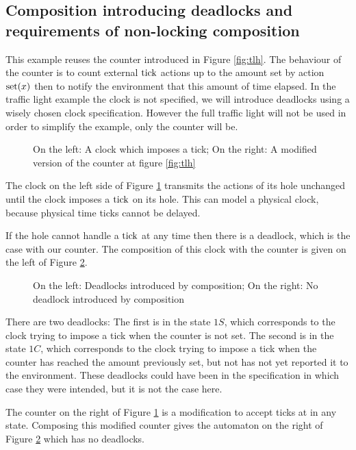 \documentclass{article}
\begin{document}
\subsection{Composition introducing deadlocks and requirements of non-locking composition}\label{apx:lockcomp}
\begin{exi}
This example reuses the counter introduced in Figure \ref{fig:tlh}.
The behaviour of the counter is to count external \(\mathrm{tick}\) actions up to the amount set by action \(\mathrm{set}{\left(x\right)}\) then to notify the environment that this amount of time elapsed.
In the traffic light example the clock is not specified, we will introduce deadlocks using a wisely chosen clock specification.
However the full traffic light will not be used in order to simplify the example, only the counter will be.
\begin{figure}

\vrule

\caption{On the left: A clock which imposes a tick; On the right: A modified version of the counter at figure \ref{fig:tlh}}
\label{fig:anytick}
\end{figure}
The clock on the left side of Figure \ref{fig:anytick} transmits the actions of its hole unchanged until the clock imposes a \(\mathrm{tick}\) on its hole.
This can model a physical clock, because physical time ticks cannot be delayed.

If the hole cannot handle a \(\mathrm{tick}\) at any time then there is a deadlock, which is the case with our counter.
The composition of this clock with the counter is given on the left of Figure \ref{fig:deadlock}.
\begin{figure}

\vrule

\caption{On the left: Deadlocks introduced by composition; On the right: No deadlock introduced by composition}
\label{fig:deadlock}
\end{figure}
There are two deadlocks:
The first is in the state \(1S\), which corresponds to the clock trying to impose a tick when the counter is not set.
The second is in the state \(1C\), which corresponds to the clock trying to impose a tick when the counter has reached the amount previously set, but not has not yet reported it to the environment.
These deadlocks could have been in the specification in which case they were intended, but it is not the case here.

The counter on the right of Figure \ref{fig:anytick} is a modification to accept ticks at in any state.
Composing this modified counter gives the automaton on the right of Figure \ref{fig:deadlock} which has no deadlocks.


\end{exi}
\end{document}
